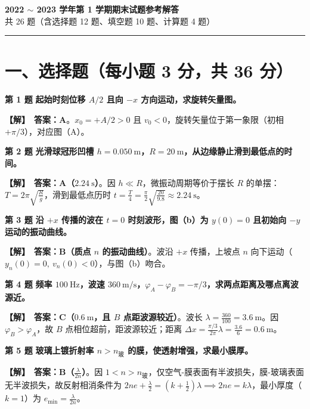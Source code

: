\documentclass[zihao=5,a4paper,UTF8]{ctexart}
\newenvironment{prob}[2]{%
    \par\vspace{5pt}\noindent\textbf{\color{navy}#1} \textbf{#2}\par\nopagebreak\vspace{2pt}%
}{%
    \par\vspace{3pt}%
}
\newcommand{\sol}{\noindent\textbf{\color{tealaccent}【解】}\ }
\begin{document}
\begin{center}
    {\Large\bfseries\color{navy} 2022 $\sim$ 2023 学年第 1 学期期末试题参考解答}\\[4pt]
    {\small\color{gray} 共 26 题（含选择题 12 题、填空题 10 题、计算题 4 题）}
\end{center}
\vspace{2pt}\hrule\vspace{6pt}


\section*{一、选择题（每小题 3 分，共 36 分）}

\begin{prob}{第 1 题}{起始时刻位移 $A/2$ 且向 $-x$ 方向运动，求旋转矢量图。}
\sol \textbf{答案：A}。$x_0 = +A/2 > 0$ 且 $v_0 < 0$，旋转矢量位于第一象限（初相 $+\pi/3$），对应图（A）。
\end{prob}

\begin{prob}{第 2 题}{光滑球冠形凹槽 $h=0.050\ \mathrm{m}$，$R=20\ \mathrm{m}$，从边缘静止滑到最低点的时间。}
\sol \textbf{答案：A（$2.24\ \mathrm{s}$）}。因 $h \ll R$，微振动周期等价于摆长 $R$ 的单摆：$T = 2\pi\sqrt{\frac{R}{g}}$，滑到最低点历时 $t = \frac{T}{4} = \frac{\pi}{2}\sqrt{\frac{20}{9.8}} \approx 2.24\ \mathrm{s}$。
\end{prob}

\begin{prob}{第 3 题}{沿 $+x$ 传播的波在 $t=0$ 时刻波形，图（b）为 $y(0)=0$ 且初始向 $-y$ 运动的振动曲线。}
\sol \textbf{答案：B（质点 $n$ 的振动曲线）}。波沿 $+x$ 传播，上坡点 $n$ 向下运动（$y_n(0)=0,\ v_n(0)<0$），与图（b）吻合。
\end{prob}

\begin{prob}{第 4 题}{频率 $100\ \mathrm{Hz}$，波速 $360\ \mathrm{m/s}$，$\varphi_A - \varphi_B = -\pi/3$，求两点距离及哪点离波源近。}
\sol \textbf{答案：C（$0.6\ \mathrm{m}$，且 $B$ 点距波源较近）}。波长 $\lambda = \frac{360}{100} = 3.6\ \mathrm{m}$。因 $\varphi_B > \varphi_A$，故 $B$ 点相位超前，距波源较近；距离 $\Delta x = \frac{\pi/3}{2\pi}\lambda = \frac{3.6}{6} = 0.6\ \mathrm{m}$。
\end{prob}

\begin{prob}{第 5 题}{玻璃上镀折射率 $n > n_{\text{玻}}$ 的膜，使透射增强，求最小膜厚。}
\sol \textbf{答案：B（$\frac{\lambda}{2n}$）}。因 $1 < n > n_{\text{玻}}$，仅空气-膜表面有半波损失，膜-玻璃表面无半波损失，故反射相消条件为 $2ne + \frac{\lambda}{2} = \left(k + \frac{1}{2}\right)\lambda \implies 2ne = k\lambda$，最小厚度（$k=1$）为 $e_{\min} = \frac{\lambda}{2n}$。
\end{prob}
\end{document}
